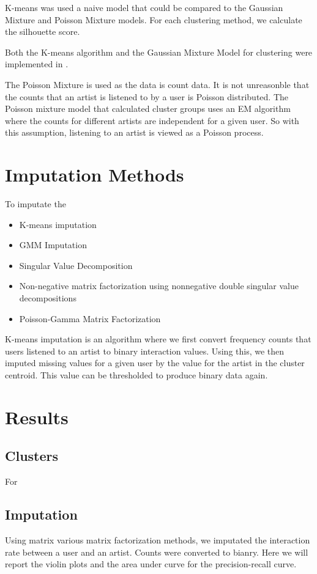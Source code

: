 \documentclass{article} %
\begin{document}
K-means was used a naive model that could be compared to the Gaussian Mixture and Poisson Mixture models. For each clustering method, we calculate the silhouette score. 

Both the K-means algorithm and the Gaussian Mixture Model for clustering were implemented in \cite{scikit-learn}. 

The Poisson Mixture is used as the data is count data. It is not unreasonble that the counts that an artist is listened to by a user is Poisson distributed. The Poisson mixture model that calculated cluster groups uses an EM algorithm where the counts for different artists are independent for a given user. So with this assumption, listening to an artist is viewed as a Poisson process. 

\section{Imputation Methods}
To imputate the 

\begin{itemize}
    \item K-means imputation
    \item GMM Imputation
    \item Singular Value Decomposition
    \item Non-negative matrix factorization using nonnegative double singular value decompositions
    \item Poisson-Gamma Matrix Factorization
\end{itemize}


K-means imputation is an algorithm where we first convert frequency counts that users listened to an artist to binary interaction values. Using this, we then imputed missing values for a given user by the value for the artist in the cluster centroid. This value can be thresholded to produce binary data again. 
\section{Results}



\subsection{Clusters}
For

\subsection{Imputation}
Using matrix various matrix factorization methods, we imputated the interaction rate between a user and an artist. Counts were converted to bianry. Here we will report the violin plots and the area under curve for the precision-recall curve. 
\end{document}
